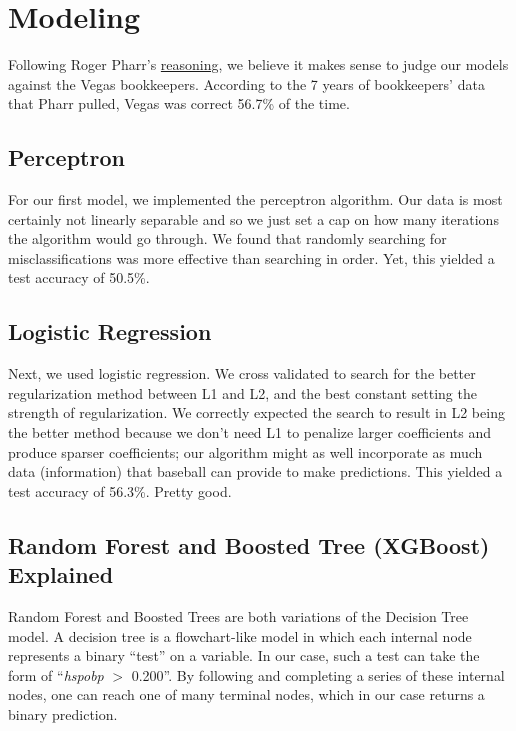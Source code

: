 \documentclass[12pt,onecolumn]{article}
\begin{document}
\section*{Modeling}
Following Roger Pharr's \href{https://towardsdatascience.com/predicting-mlb-game-outcomes-with-machine-learning-594eac9484e9}{reasoning}, we believe it makes sense to judge our models against the Vegas bookkeepers. According to the 7 years of bookkeepers' data that Pharr pulled, Vegas was correct 56.7\% of the time.

\subsection*{Perceptron}
For our first model, we implemented the perceptron algorithm. Our data is most certainly not linearly separable and so we just set a cap on how many iterations the algorithm would go through. We found that randomly searching for misclassifications was more effective than searching in order. Yet, this yielded a test accuracy of 50.5\%.

\subsection*{Logistic Regression}
Next, we used logistic regression. We cross validated to search for the better regularization method between L1 and L2, and the best constant setting the strength of regularization. We correctly expected the search to result in L2 being the better method because we don't need L1 to penalize larger coefficients and produce sparser coefficients; our algorithm might as well incorporate as much data (information) that baseball can provide to make predictions. This yielded a test accuracy of 56.3\%. Pretty good.

\subsection*{Random Forest and Boosted Tree (XGBoost) Explained}
Random Forest and Boosted Trees are both variations of the Decision Tree model. A decision tree is a flowchart-like model in which each internal node represents a binary “test” on a variable. In our case, such a test can take the form of “\textit{h\textunderscore sp\textunderscore obp} $>$ 0.200”. By following and completing a series of these internal nodes, one can reach one of many terminal nodes, which in our case returns a binary prediction. \vspace*{4mm}
\end{document}
